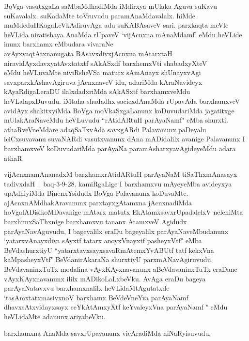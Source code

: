 \begin{artha}
BoVga vasutxgaLa saMbaMdhadiMda iMdirxya mUlaka Aguva suKavu suKavalalx. suKadaMte toVruvudu paramAnaMdavalalx. hiMde muMdeduHKagaLeVkAdiruvAga adu suKABAsaveV sari. parxkaqta meVle heVLida niratishaya AnaMda rUpaveV `vijAcnxna mAnaMdamf' eMdu heVLide. inunx barxhamx eMbudara vivaraNe\\
avAyxvaqtAtxnanugata BAsavxdivxjAcnxna mAtarxtaH\\
niravidAyxdavxyatAvxtatxtf sAkASxdf barxhemxVti shabadxyXteV\\
eMdu heVLuvaMte niviRsheVSa matutx sAmAnayx shUnayxvAgi savxparxkAshavAgiruva jAcnxnaveV idu, adariMda kAraNavideyx kAyaRdigaLeraDU ilalxdadxriMda sAkASxtf barxhamxveMdu heVLalapxDuvudu. iMtaha shudadhx sacicxdAnaMda rUpavAda barxhamxveV avidAyx shakitxyiMda BoVga moVkaSxgaLanunx koDuvudariMda jagatitxge mUlakAraNaveMdu heVLuvudu ``rAtidARtuH parAyaNamf" eMba shurxti, athaRveVneMdare adaqSaTxvAda savxgARdi Palavanunx paDeyalu iciCxsuvavanu suvaNARdi vasutxvanunx dAna mADidalilx avanige Palavanunx I barxhamxveV koDuvudariMda parAyaNa paramAsharxyavAgideyeMdu adara athaR. 
\end{artha}

\begin{artha}
vijAcnxnamAnanadxM barxhamxrAtidARtuH parAyaNaM tiSaThxmAnasayx tadivxdaH || baq-3-9-28. kamiRgaLige I barxhamxvu mAyeyeMba avideyxya upAdhiyiMda BinenxYsidudx BoVga Palavanunx koDuvaMte. ajAcnxnAMdhakAravanunx parxtayxgAtamxna jAcnxnadiMda hoVgalADisikoMDavanige mAtarx matutx EkAtamxsavxrUpadalelxV neleniMta barxhimxSaThxnige barxhamxvu tananx AtamxveV Agidudx parAyaNavAguvudu, I bageyalilx eraDu bageyalilx parAyaNaveMbudanunx `yatarxvA\s nayxdiva sAyxtf tatarx anoyxVnayxtf pasheyxVtf" eMba BeVdashurxtiyU ``yatarxtavxsayxsavaRmAtemxYvABUtf tatf kekxVna kaMpasheyxVtf" BeVdanirAkaraNa shurxtiyU parxmANavAgiruvudu. BeVdavaninxTuTx modalina vAyxKAyxnavanunx aBeVdavaninxTuTx eraDane vAyxKAyxnavanunx ililx mADikoLaLxbeVku. AvAga eraDu bageya parAyaNatavxvu barxhamxnalilx heVLidaMtAgutatxde \\`tasAmxtatxmasivxnoV barxhamx BeVdeVneYva parAyaNamf \\dhavxsAtxvidayxsayx ceYkAtAmxyXtf keYvaleyxVna parAyaNamf " eMdu heVLidaMte adanunx ariyabeVku.
\end{artha}

\begin{center}
barxhamxna AnaMda savxrUpavanunx vicAradiMda niNaRyisuvudu.
\end{center}

